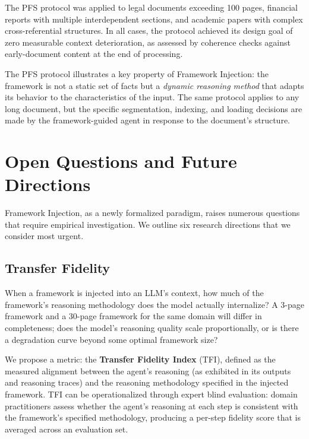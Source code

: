 \documentclass[12pt,a4paper]{article}
\begin{document}
The PFS protocol was applied to legal documents exceeding 100 pages, financial reports with multiple interdependent sections, and academic papers with complex cross-referential structures. In all cases, the protocol achieved its design goal of zero measurable context deterioration, as assessed by coherence checks against early-document content at the end of processing.

The PFS protocol illustrates a key property of Framework Injection: the framework is not a static set of facts but a \emph{dynamic reasoning method} that adapts its behavior to the characteristics of the input. The same protocol applies to any long document, but the specific segmentation, indexing, and loading decisions are made by the framework-guided agent in response to the document's structure.


\section{Open Questions and Future Directions}
\label{sec:future}

Framework Injection, as a newly formalized paradigm, raises numerous questions that require empirical investigation. We outline six research directions that we consider most urgent.

\subsection{Transfer Fidelity}
\label{sec:future:fidelity}

When a framework is injected into an LLM's context, how much of the framework's reasoning methodology does the model actually internalize? A 3-page framework and a 30-page framework for the same domain will differ in completeness; does the model's reasoning quality scale proportionally, or is there a degradation curve beyond some optimal framework size?

We propose a metric: the \textbf{Transfer Fidelity Index} (TFI), defined as the measured alignment between the agent's reasoning (as exhibited in its outputs and reasoning traces) and the reasoning methodology specified in the injected framework. TFI can be operationalized through expert blind evaluation: domain practitioners assess whether the agent's reasoning at each step is consistent with the framework's specified methodology, producing a per-step fidelity score that is averaged across an evaluation set.
\end{document}
